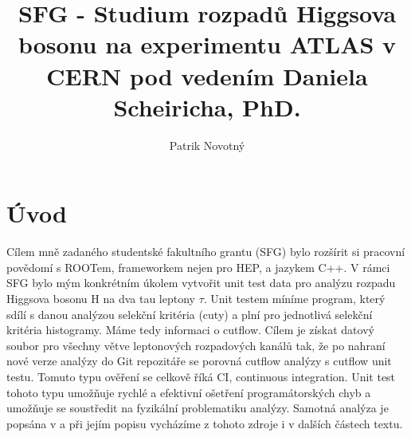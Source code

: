 \documentclass{article}
\author{Patrik Novotný}
\title{SFG -  Studium rozpadů Higgsova bosonu na experimentu ATLAS v CERN pod vedením Daniela Scheiricha, PhD.}
\begin{document}
\maketitle
\section*{Úvod}
\par Cílem mně zadaného studentské fakultního grantu (SFG) bylo rozšírit si pracovní povědomí s ROOTem, frameworkem nejen pro HEP, a jazykem C++. V rámci SFG bylo mým konkrétním úkolem vytvořit unit test data pro analýzu rozpadu Higgsova bosonu H na dva tau leptony $\tau$. Unit testem míníme program, který sdílí s danou analýzou selekční kritéria (cuty) a plní pro jednotlivá selekční kritéria histogramy. Máme tedy informaci o cutflow. Cílem je získat datový soubor pro všechny větve leptonových rozpadových kanálů tak, že po nahraní nové verze analýzy do Git repozitáře se porovná cutflow analýzy s cutflow unit testu. Tomuto typu ověření se celkově říká CI, continuous integration. Unit test tohoto typu umožňuje rychlé a efektivní ošetření programátorských chyb a umožňuje se soustředit na fyzikální problematiku analýzy. Samotná analýza je popsána v \cite{DanovaSkupina} a při jejím popisu vycházíme z tohoto zdroje i v dalších částech textu.
\end{document}
